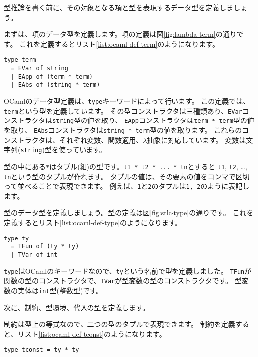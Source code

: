 型推論を書く前に、その対象となる項と型を表現するデータ型を定義しましょう。

まずは、項のデータ型を定義します。項の定義は図\ref{fig:lambda-term}の通りです。
これを定義するとリスト\ref{list:ocaml-def-term}のようになります。

\begin{lstlisting}[caption=項の定義, label=list:ocaml-def-term]
type term
  = EVar of string
  | EApp of (term * term)
  | EAbs of (string * term)
\end{lstlisting}

OCamlのデータ型定義は、\texttt{type}キーワードによって行います。
この定義では、\texttt{term}という型を定義しています。
その型コンストラクタは三種類あり、\texttt{EVar}コンストラクタは\texttt{string}型の値を取り、
\texttt{EApp}コンストラクタは\texttt{term * term}型の値を取り、
\texttt{EAbs}コンストラクタは\texttt{string * term}型の値を取ります。
これらのコンストラクタは、それぞれ変数、関数適用、$\lambda$抽象に対応しています。
変数は文字列(\texttt{string})型を使っています。

型の中にある\texttt{*}はタプル(組)の型です。\texttt{t1 * t2 * ... * tn}とすると
\texttt{t1}, \texttt{t2}, \dots, \texttt{tn}という型のタプルが作れます。
タプルの値は、その要素の値をコンマで区切って並べることで表現できます。
例えば、\texttt{1}と\texttt{2}のタプルは\texttt{1, 2}のように表記します。

型のデータ型を定義しましょう。型の定義は図\ref{fig:stlc-type}の通りです。
これを定義するとリスト\ref{list:ocaml-def-type}のようになります。

\begin{lstlisting}[caption=型の定義, label=list:ocaml-def-type]
type ty
  = TFun of (ty * ty)
  | TVar of int
\end{lstlisting}

\texttt{type}はOCamlのキーワードなので、\texttt{ty}という名前で型を定義しました。
\texttt{TFun}が関数の型のコンストラクタで、\texttt{TVar}が型変数の型のコンストラクタです。
型変数の実体は\texttt{int}型(整数型)です。

次に、制約、型環境、代入の型を定義します。

制約は型上の等式なので、二つの型のタプルで表現できます。
制約を定義すると、リスト\ref{list:ocaml-def-tconst}のようになります。

\begin{lstlisting}[caption=制約の定義, label=list:ocaml-def-tconst]
type tconst = ty * ty
\end{lstlisting}

